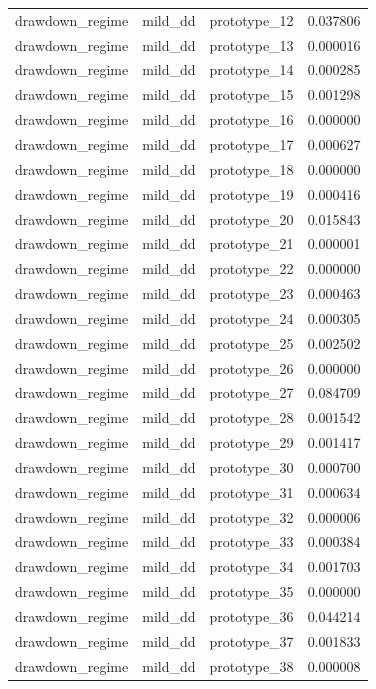 \begin{tabular}{lllr}
drawdown\_regime & mild\_dd & prototype\_12 & 0.037806 \\
drawdown\_regime & mild\_dd & prototype\_13 & 0.000016 \\
drawdown\_regime & mild\_dd & prototype\_14 & 0.000285 \\
drawdown\_regime & mild\_dd & prototype\_15 & 0.001298 \\
drawdown\_regime & mild\_dd & prototype\_16 & 0.000000 \\
drawdown\_regime & mild\_dd & prototype\_17 & 0.000627 \\
drawdown\_regime & mild\_dd & prototype\_18 & 0.000000 \\
drawdown\_regime & mild\_dd & prototype\_19 & 0.000416 \\
drawdown\_regime & mild\_dd & prototype\_20 & 0.015843 \\
drawdown\_regime & mild\_dd & prototype\_21 & 0.000001 \\
drawdown\_regime & mild\_dd & prototype\_22 & 0.000000 \\
drawdown\_regime & mild\_dd & prototype\_23 & 0.000463 \\
drawdown\_regime & mild\_dd & prototype\_24 & 0.000305 \\
drawdown\_regime & mild\_dd & prototype\_25 & 0.002502 \\
drawdown\_regime & mild\_dd & prototype\_26 & 0.000000 \\
drawdown\_regime & mild\_dd & prototype\_27 & 0.084709 \\
drawdown\_regime & mild\_dd & prototype\_28 & 0.001542 \\
drawdown\_regime & mild\_dd & prototype\_29 & 0.001417 \\
drawdown\_regime & mild\_dd & prototype\_30 & 0.000700 \\
drawdown\_regime & mild\_dd & prototype\_31 & 0.000634 \\
drawdown\_regime & mild\_dd & prototype\_32 & 0.000006 \\
drawdown\_regime & mild\_dd & prototype\_33 & 0.000384 \\
drawdown\_regime & mild\_dd & prototype\_34 & 0.001703 \\
drawdown\_regime & mild\_dd & prototype\_35 & 0.000000 \\
drawdown\_regime & mild\_dd & prototype\_36 & 0.044214 \\
drawdown\_regime & mild\_dd & prototype\_37 & 0.001833 \\
drawdown\_regime & mild\_dd & prototype\_38 & 0.000008 \\

\end{tabular}

